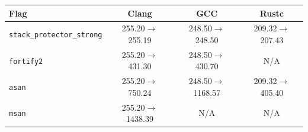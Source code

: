 \begin{tabular*}{\columnwidth}{@{\extracolsep\fill}lccc@{\extracolsep\fill}}
\toprule
\textbf{Flag} & \textbf{Clang} & \textbf{GCC} & \textbf{Rustc} \\
\midrule
\texttt{stack\_protector\_strong} & 255.20$\to$255.19 & 248.50$\to$248.50 & 209.32$\to$207.43 \\
\texttt{fortify2} & 255.20$\to$431.30 & 248.50$\to$430.70 & N/A \\
\texttt{asan} & 255.20$\to$750.24 & 248.50$\to$1168.57 & 209.32$\to$405.40 \\
\texttt{msan} & 255.20$\to$1438.39 & N/A & N/A \\
\bottomrule
\end{tabular*}
